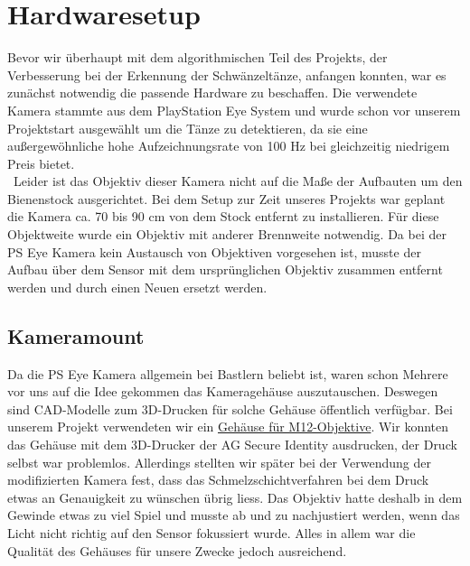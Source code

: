 \documentclass[11pt,a4paper]{article}
\title{\Veranstaltung}
\author{\Autoren}
\date{\today}
\begin{document}
\maketitle

\section{Hardwaresetup}

Bevor wir überhaupt mit dem algorithmischen Teil des Projekts, der Verbesserung bei der Erkennung der Schwänzeltänze,
anfangen konnten, war es zunächst notwendig die passende Hardware zu beschaffen.
Die verwendete Kamera stammte aus dem PlayStation Eye System und wurde schon vor unserem Projektstart ausgewählt um 
die Tänze zu detektieren, da sie eine außergewöhnliche hohe Aufzeichnungsrate von 100 Hz bei gleichzeitig niedrigem Preis bietet.\\\
Leider ist das Objektiv dieser Kamera nicht auf die Maße der Aufbauten um den Bienenstock ausgerichtet.
Bei dem Setup zur Zeit unseres Projekts war geplant die Kamera ca. 70 bis 90 cm von dem Stock entfernt zu installieren.
Für diese Objektweite wurde ein Objektiv mit anderer Brennweite notwendig.
Da bei der PS Eye Kamera kein Austausch von Objektiven vorgesehen ist, musste der Aufbau über dem Sensor mit dem ursprünglichen
Objektiv zusammen entfernt werden und durch einen Neuen ersetzt werden.

\subsection{Kameramount}

Da die PS Eye Kamera allgemein bei Bastlern beliebt ist, waren schon Mehrere vor uns auf die Idee gekommen das Kameragehäuse auszutauschen.
Deswegen sind CAD-Modelle zum 3D-Drucken für solche Gehäuse öffentlich verfügbar.
Bei unserem Projekt verwendeten wir ein \href{http://www.thingiverse.com/thing:83754}{Gehäuse für M12-Objektive}.
Wir konnten das Gehäuse mit dem 3D-Drucker der AG Secure Identity ausdrucken, der Druck selbst war problemlos.
Allerdings stellten wir später bei der Verwendung der modifizierten Kamera fest, dass das Schmelzschichtverfahren bei dem Druck
etwas an Genauigkeit zu wünschen übrig liess.
Das Objektiv hatte deshalb in dem Gewinde etwas zu viel Spiel und musste ab und zu nachjustiert werden, wenn das Licht nicht richtig
auf den Sensor fokussiert wurde.
Alles in allem war die Qualität des Gehäuses für unsere Zwecke jedoch ausreichend.
\end{document}
